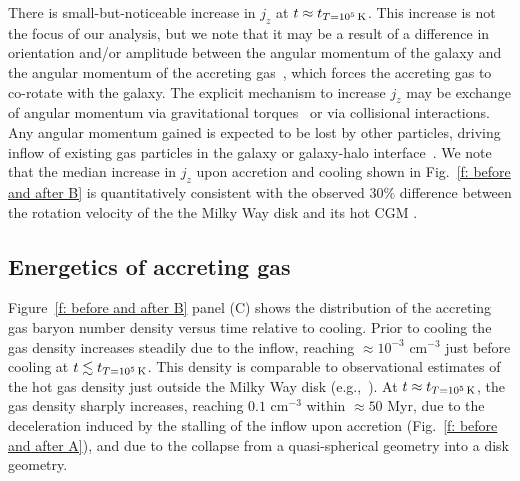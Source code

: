 \documentclass[fleqn,usenatbib]{mnras}
\newcommand{\tcon}{t_{T=10^5\,{\rm K}}}
\begin{document}
There is small-but-noticeable increase in $j_z$ at $t \approx \tcon$.
This increase is not the focus of our analysis, but we note that it may be a result of a difference in orientation and/or amplitude between the angular momentum of the galaxy and the angular momentum of the accreting gas~\citep[e.g.][]{Danovich2012, DeFelippis2017}, which forces the accreting gas to co-rotate with the galaxy.
The explicit mechanism to increase $j_z$ may be exchange of angular momentum via gravitational torques~\citep[e.g.][]{Danovich2015} or via collisional interactions.
Any angular momentum gained is expected to be lost by other particles, driving inflow of existing gas particles in the galaxy or galaxy-halo interface~\citep[e.g.][]{Mayor1981, Pezzulli2017}.
We note that the median increase in $j_z$ upon accretion and cooling shown in Fig.~\ref{f: before and after B} is quantitatively consistent with the observed $30\%$ difference between the rotation velocity of the the Milky Way disk and its hot CGM \citep{Hodges-Kluck2016}.

\subsection{Energetics of accreting gas}
\label{s: mechanics -- energy balance}

Figure~\ref{f: before and after B} panel (C) shows the distribution of the accreting gas baryon number density  versus time relative to cooling.
Prior to cooling the gas density increases steadily due to the inflow, reaching $\approx10^{-3}$ cm$^{-3}$ just before cooling at $t\lesssim\tcon$.
This density is comparable to observational estimates of the hot gas density just outside the Milky Way disk (e.g.,~\cite{Li2017a}).
At $t\approx\tcon$, the gas density sharply increases, reaching $0.1$ cm$^{-3}$ within $\approx50$ Myr, due to the deceleration induced by the stalling of the inflow upon accretion (Fig.~\ref{f: before and after A}), and due to the collapse from a quasi-spherical geometry into a disk geometry. 
\end{document}
